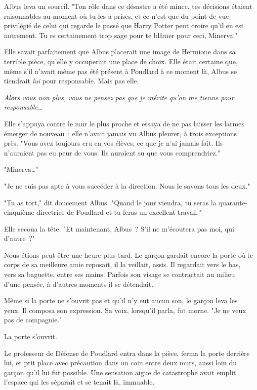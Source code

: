 Albus leva un sourcil. "Ton rôle dans ce désastre a été mince, tes décisions étaient raisonnables au moment où tu les a prises, et ce n'est que du point de vue privilégié de celui qui regarde le passé que Harry Potter peut croire qu'il en est autrement. Tu es certainement trop sage pour te blâmer pour ceci, Minerva."

Elle savait parfaitement que Albus placerait une image de Hermione dans sa terrible pièce, qu'elle y occuperait une place de choix. Elle était certaine que, même s'il n'avait même pas été présent à Poudlard à ce moment là, Albus se tiendrait \emph{lui} pour responsable. Mais pas elle.

\emph{Alors vous non plus, vous ne pensez pas que je mérite qu'on me tienne pour responsable…}

Elle s'appuya contre le mur le plus proche et essaya de ne pas laisser les larmes émerger de nouveau~; elle n'avait jamais vu Albus pleurer, à trois exceptions près. "Vous avez toujours cru en vos élèves, ce que je n'ai jamais fait. Ils n'auraient pas eu peur de vous. Ils auraient su que vous comprendriez."

"Minerva…"

"Je ne suis pas apte à vous succéder à la direction. Nous le savons tous les deux."

"Tu as tort," dit doucement Albus. "Quand le jour viendra, tu seras la quarante-cinquième directrice de Poudlard et tu feras un excellent travail."

Elle secoua la tête. "Et maintenant, Albus~? S'il ne m'écoutera pas moi, qui d'autre~?"

\later

Nous étions peut-être une heure plus tard. Le garçon gardait encore la porte où le corps de sa meilleure amie reposait, il la veillait, assis. Il regardait vers le bas, vers sa baguette, entre ses mains. Parfois son visage se contractait au milieu d'une pensée, à d'autres moments il se détendait.

Même si la porte ne s'ouvrit pas et qu'il n'y eut aucun son, le garçon leva les yeux. Il composa son expression. Sa voix, lorsqu'il parla, fut morne. "Je ne veux pas de compagnie."

La porte s'ouvrit.

Le professeur de Défense de Poudlard entra dans la pièce, ferma la porte derrière lui, et prit place avec précaution dans un coin entre deux murs, aussi loin du garçon qu'il lui fut possible. Une sensation aiguë de catastrophe avait emplit l'espace qui les séparait et se tenait là, immuable.


